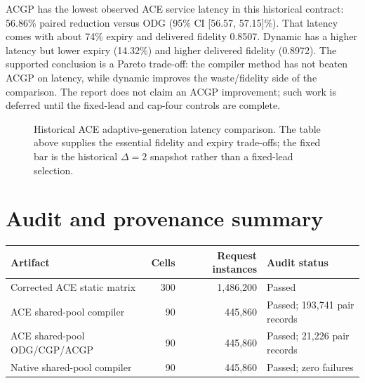 \documentclass[11pt,a4paper]{report}
\begin{document}
ACGP has the lowest observed ACE service latency in this historical contract:
56.86\% paired reduction versus ODG (95\% CI [56.57, 57.15]\%). That latency
comes with about 74\% expiry and delivered fidelity 0.8507. Dynamic has a
higher latency but lower expiry (14.32\%) and higher delivered fidelity
(0.8972). The supported conclusion is a Pareto trade-off: the compiler method
has not beaten ACGP on latency, while dynamic improves the waste/fidelity side
of the comparison. The report does not claim an ACGP improvement; such work is
deferred until the fixed-lead and cap-four controls are complete.

\begin{figure}[htbp]
\centering
{}
\caption{Historical ACE adaptive-generation latency comparison. The table
above supplies the essential fidelity and expiry trade-offs; the fixed bar is
the historical $\Delta=2$ snapshot rather than a fixed-lead selection.}
\label{fig:ace-adaptive-latency}
\end{figure}

\section{Audit and provenance summary}
\begin{center}
\begin{tabular}{lrrl}
\toprule
Artifact & Cells & Request instances & Audit status \\
\midrule
Corrected ACE static matrix & 300 & 1,486,200 & Passed \\
ACE shared-pool compiler & 90 & 445,860 & Passed; 193,741 pair records \\
ACE shared-pool ODG/CGP/ACGP & 90 & 445,860 & Passed; 21,226 pair records \\
Native shared-pool compiler & 90 & 445,860 & Passed; zero failures \\
\bottomrule
\end{tabular}
\end{center}
\end{document}
